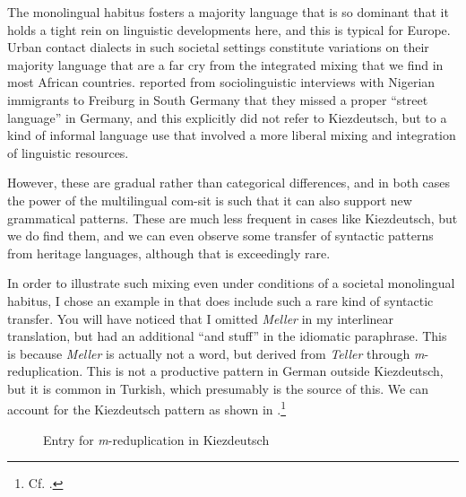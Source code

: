 The monolingual habitus fosters a majority language that is so dominant that it holds a tight rein on linguistic developments here, and this is typical for Europe. Urban contact dialects in such societal settings constitute variations on their majority language that are a far cry from the integrated mixing that we find in most African countries. \citet{Mair2022} reported from sociolinguistic interviews with Nigerian immigrants to Freiburg in South Germany that they missed a proper “street language” in Germany, and this explicitly did not refer to Kiezdeutsch, but to a kind of informal language use that involved a more liberal mixing and integration of linguistic resources.

However, these are gradual rather than categorical differences, and in both cases the power of the multilingual com-sit is such that it can also support new grammatical patterns. These are much less frequent in cases like Kiezdeutsch, but we do find them, and we can even observe some transfer of syntactic patterns from heritage languages, although that is exceedingly rare.

In order to illustrate such mixing even under conditions of a societal monolingual habitus, I chose an example in  that does include such a rare kind of syntactic transfer. You will have noticed that I omitted \textit{Meller} in my interlinear translation, but had an additional “and stuff” in the idiomatic paraphrase. This is because \textit{Meller} is actually not a word, but derived from \textit{Teller} through \textit{m}{}-reduplication. This is not a productive pattern in German outside Kiezdeutsch, but it is common in Turkish, which presumably is the source of this. We can account for the Kiezdeutsch pattern as shown in .\footnote{Cf. \citet{WiesePolat2016}.}

\begin{figure}
\caption{Entry for \textit{m}-reduplication in Kiezdeutsch\label{fig:wiese:6-1}}
\end{figure}

